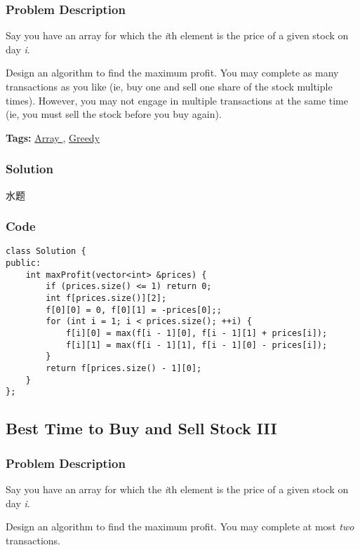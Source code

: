 \documentclass{article}
\begin{document}
\begin{CJK*}{UTF8}{gkai}
\subsubsection*{Problem Description}
Say you have an array for which the \emph{i}th element is the price of a given stock on day \emph{i}.

Design an algorithm to find the maximum profit. You may complete as many transactions as you like (ie, buy one and sell one share of the stock multiple times). However, you may not engage in multiple transactions at the same time (ie, you must sell the stock before you buy again).


\textbf{Tags: }
\hyperref[ Array ]{ Array },  \hyperref[ Greedy ]{ Greedy }



\subsubsection*{Solution}
水题

\subsubsection*{Code}
\begin{lstlisting}
class Solution {
public:
    int maxProfit(vector<int> &prices) {
        if (prices.size() <= 1) return 0;
        int f[prices.size()][2];
        f[0][0] = 0, f[0][1] = -prices[0];;
        for (int i = 1; i < prices.size(); ++i) {
            f[i][0] = max(f[i - 1][0], f[i - 1][1] + prices[i]);
            f[i][1] = max(f[i - 1][1], f[i - 1][0] - prices[i]);
        }
        return f[prices.size() - 1][0];
    }
}; 
\end{lstlisting}


\subsection{ Best Time to Buy and Sell Stock III }
\label{ Best Time to Buy and Sell Stock III }

\subsubsection*{Problem Description}
Say you have an array for which the \emph{i}th element is the price of a given stock on day \emph{i}.

Design an algorithm to find the maximum profit. You may complete at most \emph{two} transactions.


\end{CJK*}
\end{document}
